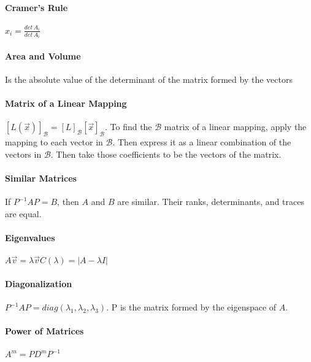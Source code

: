 \documentclass[10pt,letter]{article}
\begin{document}
\paragraph{Cramer's Rule}$x_i=\frac{det\,A_i}{det\,A_i}$ 
\paragraph{Area and Volume} Is the absolute value of the determinant of the matrix formed by the vectors 
\paragraph{Matrix of a Linear Mapping}$[L(\vec{x})]_\mathcal{B}=[L]_\mathcal{B}[\vec{x}]_\mathcal{B}$. To find the $\mathcal{B}$ matrix of a linear mapping, apply the mapping to each vector in $\mathcal{B}$. Then express it as a linear combination of the vectors in $\mathcal{B}$. Then take those coefficients to be the vectors of the matrix. 
\paragraph{Similar Matrices} If $P^{-1}AP=B$, then $A$ and $B$ are similar. Their ranks, determinants, and traces are equal. 
\paragraph{Eigenvalues} $A\vec{v}=\lambda\vec{v}$\quad$C(\lambda)=|A-\lambda I|$
\paragraph{Diagonalization} $P^{-1}AP=diag(\lambda_1,\lambda_2,\lambda_3)$. P is the matrix formed by the eigenspace of $A$. 
\paragraph{Power of Matrices} $A^m=PD^mP^{-1}$
\end{document}
